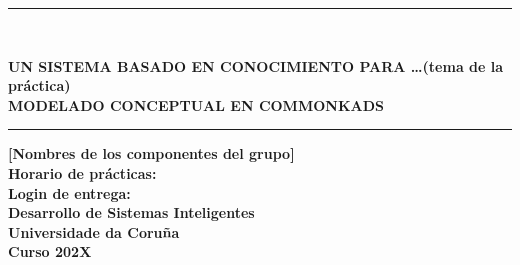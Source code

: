 \documentclass[12pt,a4paper,twoside,spanish]{article}      %
\begin{document}
\def\chaptername{Capítulo}
\def\tablename{Tabla}
\def\listtablename{Índice de Tablas}
\chapterfont{\LARGE\raggedleft}

\pagestyle{empty}

\begin{titlepage}
\setlength{\parindent}{0cm} \setlength{\parskip}{0cm}


\newcommand{\HRule}{\rule{\linewidth}{1mm}}

\vspace*{2cm}
\HRule \\[0.5cm]
\begin{center}
\textsf{\textbf{\large UN SISTEMA BASADO EN CONOCIMIENTO PARA \ldots(tema de la práctica)\\[0.75cm] MODELADO CONCEPTUAL EN COMMONKADS \\[0.5cm]}}
\HRule \vspace*{3cm}

\textsf{\textbf{\normalsize [Nombres de los componentes del
grupo]\\[5cm]
Horario de prácticas:\\
Login de entrega: \\[2.5cm]
Desarrollo de Sistemas Inteligentes\\
Universidade da Coruña \\ Curso
202X}}
\end{center}
\end{titlepage}

\cleardoublepage


\tableofcontents
\cleardoublepage



 \pagestyle{myheadings} 
\end{document}
